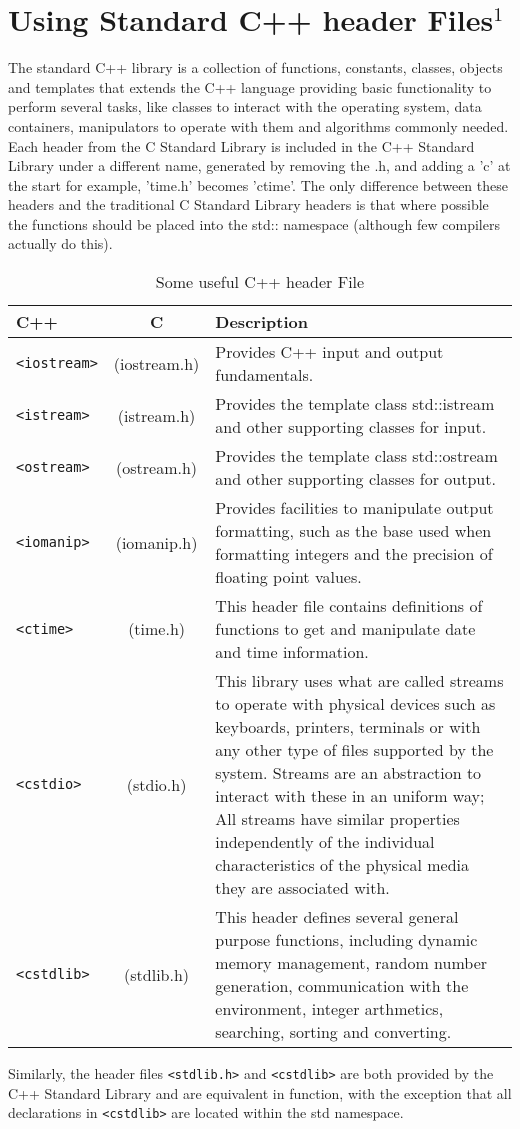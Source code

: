 \documentclass[12pt,a4paper]{article}
\begin{document}
\section{Using Standard C++ header Files$^1$}
The standard C++ library is a collection of functions, constants, classes, objects and templates that extends the C++ language providing basic functionality to perform several tasks, like classes to interact with the operating system, data containers, manipulators to operate with them and algorithms commonly needed.\\
Each header from the C Standard Library is included in the C++ Standard Library under a different name, generated by removing the .h, and adding a 'c' at the start for example, 'time.h' becomes 'ctime'. The only difference between these headers and the traditional C Standard Library headers is that where possible the functions should be placed into the std:: namespace (although few compilers actually do this).\\
\begin{table}[htb]
\begin{center}
\vspace{0.3cm}
	\begin{tabular}{lcp{10cm}}
	\hline \hline
		\textbf{C++} \rule{0pt}{2.6ex} & \textbf{C} & \textbf{Description}\\
		\hline
		\verb|<iostream>| \rule{0pt}{2.6ex} & (iostream.h) & Provides C++ input and output fundamentals.\\
		\verb|<istream>| & (istream.h) & Provides the template class std::istream and other supporting classes for input.\\
		\verb|<ostream>| & (ostream.h) & Provides the template class std::ostream and other supporting classes for output.\\
		\verb|<iomanip>| & (iomanip.h) & Provides facilities to manipulate output formatting, such as the base used when formatting integers and the precision of floating point values.\\
		\verb|<ctime>|   & (time.h) & This header file contains definitions of functions to get and manipulate date and time information.\\
		\verb|<cstdio>| & (stdio.h) &  This library uses what are called streams to operate with physical devices such as keyboards, printers, terminals or with any other type of files supported by the system. Streams are an abstraction to interact with these in an uniform way; All streams have similar properties independently of the individual characteristics of the physical media they are associated with.\\
		\verb|<cstdlib>| &(stdlib.h)& This header defines several general purpose functions, including dynamic memory management, random number generation, communication with the environment, integer arthmetics, searching, sorting and converting.\\
		
	\hline \hline
	\end{tabular}
\end{center}
\label{Some useful C++ header File}
\caption{Some useful C++ header File}
\end{table}
Similarly, the header files \verb|<stdlib.h>| and \verb|<cstdlib>| are both provided by the C++ Standard Library and are equivalent in function, with the exception that all declarations in \verb|<cstdlib>| are located within the std namespace.
\end{document}
